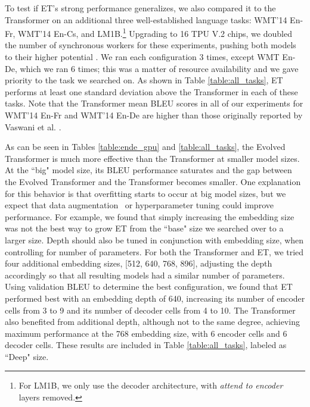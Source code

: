 \documentclass{article}
\begin{document}
To test if ET's strong performance generalizes, we also compared it to the Transformer on an additional three well-established language tasks: WMT'14 En-Fr, WMT'14 En-Cs, and LM1B.\footnote{For LM1B, we only use the decoder architecture, with \textit{attend to encoder} layers removed.} Upgrading to 16 TPU V.2 chips, we doubled the number of synchronous workers for these experiments, pushing both models to their higher potential \cite{ott18}. We ran each configuration 3 times, except WMT En-De, which we ran 6 times; this was a matter of resource availability and we gave priority to the task we searched on. As shown in Table \ref{table:all_tasks}, ET performs at least one standard deviation above the Transformer in each of these tasks. Note that the Transformer mean BLEU scores in all of our experiments for WMT'14 En-Fr and WMT'14 En-De are higher than those originally reported by Vaswani et al. .

As can be seen in Tables \ref{table:ende_gpu} and \ref{table:all_tasks}, the Evolved Transformer is much more effective than the Transformer at smaller model sizes. 
At the ``big" model size, its BLEU performance saturates and the gap between the Evolved Transformer and the Transformer becomes smaller. One explanation for this behavior is that overfitting starts to occur at big model sizes, but we expect that data augmentation~\cite{ott18} or hyperparameter tuning could improve performance.
For example, we found that simply increasing the embedding size was not the best way to grow ET from the ``base" size we searched over to a larger size. Depth should also be tuned in conjunction with embedding size, when controlling for number of parameters. For both the Transformer and ET, we tried four additional embedding sizes, [512, 640, 768, 896], adjusting the depth accordingly so that all resulting models had a similar number of parameters. Using validation BLEU to determine the best configuration, we found that ET performed best with an embedding depth of 640, increasing its number of encoder cells from 3 to 9 and its number of decoder cells from 4 to 10. The Transformer also benefited from additional depth, although not to the same degree, achieving maximum performance at the 768 embedding size, with 6 encoder cells and 6 decoder cells. These results are included in Table \ref{table:all_tasks}, labeled as ``Deep" size.
\end{document}
